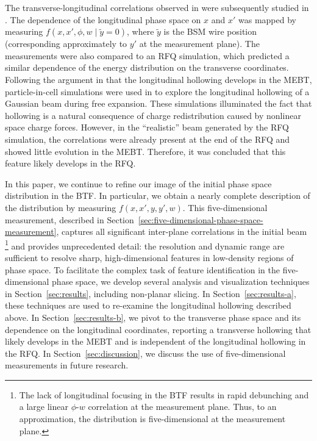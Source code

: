 \documentclass[%
 reprint,
 amsmath,amssymb,
 aps,
prstab,
]{revtex4-2}
\begin{document}
The transverse-longitudinal correlations observed in \cite{Cathey2018} were subsequently studied in \cite{Ruisard2020}. The dependence of the longitudinal phase space on $x$ and $x'$ was mapped by measuring $f(x, x', \phi, w \mid \tilde{y}{=}0)$, where $\tilde{y}$ is the BSM wire position (corresponding approximately to $y'$ at the measurement plane). The measurements were also compared to an RFQ simulation, which predicted a similar dependence of the energy distribution on the transverse coordinates. Following the argument in \cite{Cathey2018} that the longitudinal hollowing develops in the MEBT, particle-in-cell simulations were used in \cite{Ruisard2021} to explore the longitudinal hollowing of a Gaussian beam during free expansion. These simulations illuminated the fact that hollowing is a natural consequence of charge redistribution caused by nonlinear space charge forces. However, in the ``realistic'' beam generated by the RFQ simulation, the correlations were already present at the end of the RFQ and showed little evolution in the MEBT. Therefore, it was concluded that this feature likely develops in the RFQ.

In this paper, we continue to refine our image of the initial phase space distribution in the BTF. In particular, we obtain a nearly complete description of the distribution by measuring $f(x, x', y, y', w)$. This five-dimensional measurement, described in Section~\ref{sec:five-dimensional-phase-space-measurement}, captures all significant inter-plane correlations in the initial beam \footnote{The lack of longitudinal focusing in the BTF results in rapid debunching and a large linear $\phi$-$w$ correlation at the measurement plane. Thus, to an approximation, the distribution is five-dimensional at the measurement plane.\label{fn:1}} and provides unprecedented detail: the resolution and dynamic range are sufficient to resolve sharp, high-dimensional features in low-density regions of phase space. To facilitate the complex task of feature identification in the five-dimensional phase space, we develop several analysis and visualization techniques in Section~\ref{sec:results}, including non-planar slicing. In Section~\ref{sec:results-a}, these techniques are used to re-examine the longitudinal hollowing described above. In Section~\ref{sec:results-b}, we pivot to the transverse phase space and its dependence on the longitudinal coordinates, reporting a transverse hollowing that likely develops in the MEBT and is independent of the longitudinal hollowing in the RFQ. In Section~\ref{sec:discussion}, we discuss the use of five-dimensional measurements in future research. 
\end{document}

